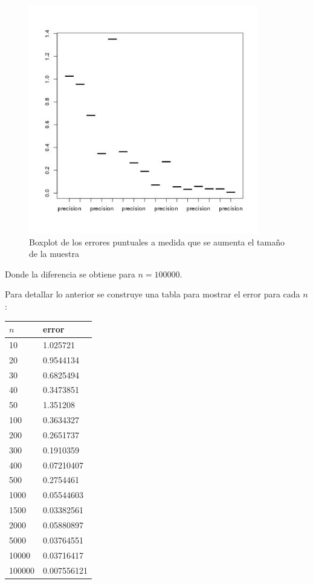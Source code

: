 \documentclass[letter,10pt]{article}
\begin{document}
      \begin{figure}[H]
        \centering
              \includegraphics[width=100mm, scale=0.3]{p6_boxplot_conv.jpg}
              \caption{Boxplot de los errores puntuales a medida que se aumenta el tamaño de la muestra}
          \end{figure}

Donde la diferencia se obtiene para $n=100000$.

Para detallar lo anterior se construye una tabla para mostrar el error para cada $n$:

\begin{table}[H]
    \centering
    \begin{tabular}{|l|l|}
    \hline
    $n$ & error \\ \hline
    10      & 1.025721     \\
    20      & 0.9544134     \\
    30      & 0.6825494    \\
    40      & 0.3473851    \\
    50      & 1.351208    \\
    100     & 0.3634327     \\
    200     & 0.2651737    \\
    300     & 0.1910359     \\
    400     & 0.07210407     \\
    500     & 0.2754461     \\
    1000     & 0.05544603     \\
    1500    & 0.03382561    \\
    2000    & 0.05880897    \\
    5000    & 0.03764551     \\
    10000    & 0.03716417    \\
    100000   & 0.007556121   \\ \hline
    \end{tabular}
\end{table}
\end{document}
